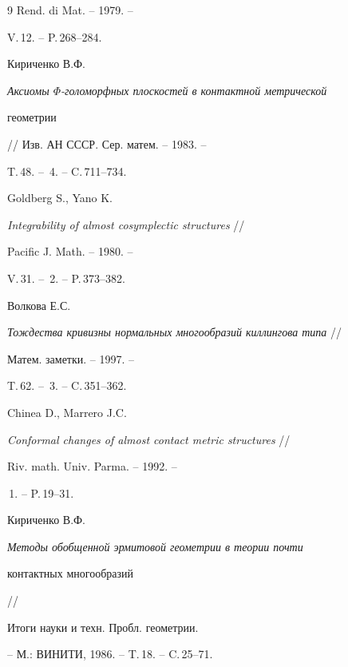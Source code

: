 \begin{thebibliography}{9}
Rend. di Mat. -- 1979. -- 


V.\,12. -- P.\,268--284.




Кириченко В.Ф.


{\em Аксиомы $\Phi$-голоморфных плоскостей в контактной метрической 


геометрии} // Изв. АН СССР. Сер. матем. -- 1983. --


T.\,48. -- \No\,4. -- C.\,711--734.




Goldberg S., Yano K.


{\em Integrability of almost cosymplectic structures} //


Pacific J. Math. -- 1980. --


V.\,31. -- \No\,2. -- P.\,373--382.




Волкова Е.С.


{\em Тождества кривизны нормальных многообразий киллингова типа} //


Матем. заметки. -- 1997. -- 


T.\,62. -- \No\,3. -- C.\,351--362.




Chinea D., Marrero J.C.


{\em Conformal changes of almost contact metric structures} //


Riv. math. Univ. Parma. -- 1992. --


\No\,1. -- P.\,19--31.




Кириченко В.Ф.


{\em Методы обобщенной эрмитовой геометрии в теории почти 


контактных многообразий} //


Итоги науки и техн. Пробл. геометрии. 


-- М.: ВИНИТИ, 1986. -- T.\,18. -- C.\,25--71.





\end{thebibliography}





\vskip 2cm












\label{end}








